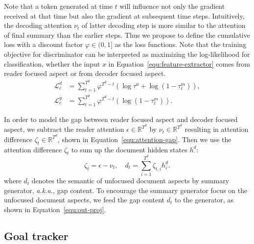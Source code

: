 \documentclass[letterpaper]{article} %
\newcommand{\aka}{\emph{a.k.a.,}\xspace}
\begin{document}
Note that a token generated at time $t$ will influence not only the gradient received at that time but also the gradient at subsequent time steps.
Intuitively, the decoding attention $\nu_t$ of latter decoding step is more similar to the attention of final summary than the earlier steps.
Thus we propose to define the cumulative loss with a discount factor $\varphi \in (0,1]$ as the loss functions.
Note that the training objective for discriminator can be interpreted as maximizing the log-likelihood for classification, whether the input $x$ in Equation~\ref{equ:feature-extractor} comes from reader focused aspect or from decoder focused aspect.
\begin{align}
    \mathcal{L}^d_c &= \textstyle \sum^{T^d}_{t=1} \varphi^{T^d-t} (\log \tau^{u} + \log (1 - \tau^m_t)), \label{equ:dis-d}\\
    \mathcal{L}^g_c &= \textstyle \sum^{T^d}_{t=1} \varphi^{T^d-t} (\log (1 - \tau^m_t)). \label{equ:dis-c}
\end{align}

In order to model the gap between reader focused aspect and decoder focused aspect, we subtract the reader attention $\epsilon \in \mathbb{R}^{T^d}$ by $\nu_{t} \in \mathbb{R}^{T^d}$ resulting in attention difference $\zeta_t \in\mathbb{R}^{T^d}$, shown in Equation~\ref{equ:attention-gap}.
Then we use the attention difference $\zeta_t$ to sum up the document hidden states $h^d_{\cdot}$:
\begin{equation}
    \zeta_t = \epsilon - \nu_{t}, \label{equ:attention-gap} \quad
    d_t = \textstyle \sum^{T^d}_{i=1} \zeta_{t, i} h^d_i .
\end{equation}
where $d_t$ denotes the semantic of unfocused document aspects by summary generator, \aka gap content.
To encourage the summary generator focus on the unfocused document aspects, we feed the gap content $d_t$ to the generator, as shown in Equation~\ref{equ:out-proj}.

\subsection{Goal tracker} \label{sec:goal-tracker}
\end{document}
